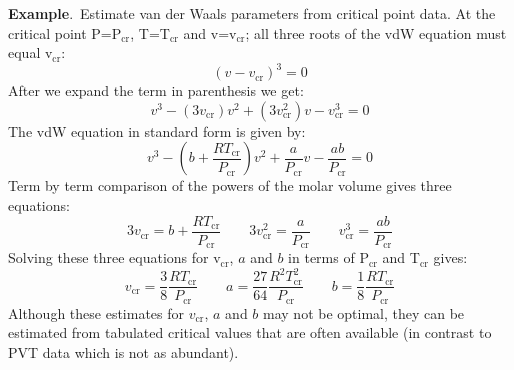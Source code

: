 \documentclass[11pt]{article}
\theoremstyle{definition}
\begin{document}
\begin{mdframed}[backgroundcolor=lgray]
\noindent\textbf{Example}.~Estimate van der Waals parameters from critical point data.
At the critical point P=P$_{\mathrm{cr}}$, T=T$_{\mathrm{cr}}$ and v=v$_{\mathrm{cr}}$;
all three roots of the vdW equation must equal v$_{\mathrm{cr}}$:
\begin{equation}
  \left(v-v_{\mathrm{cr}}\right)^3 = 0
\end{equation}
After we expand the term in parenthesis we get:
\begin{equation}
v^3-\left(3v_{\mathrm{cr}}\right)v^2+\left(3v^{2}_{\mathrm{cr}}\right)v-v^{3}_{\mathrm{cr}} = 0
\end{equation}
The vdW equation in standard form is given by:
\begin{equation}
  v^3-\left(b+\frac{RT_{\mathrm{cr}}}{P_{\mathrm{cr}}}\right)v^2+\frac{a}{P_{\mathrm{cr}}}v-\frac{ab}{P_{\mathrm{cr}}} = 0
\end{equation}
Term by term comparison of the powers of the molar volume gives three equations:
\begin{equation}
  3v_{\mathrm{cr}} = b+\frac{RT_{\mathrm{cr}}}{P_{\mathrm{cr}}}\qquad
  3v^{2}_{\mathrm{cr}} = \frac{a}{P_{\mathrm{cr}}}\qquad
  v^{3}_{\mathrm{cr}} = \frac{ab}{P_{\mathrm{cr}}}
\end{equation}
Solving these three equations for v$_{\mathrm{cr}}$, $a$ and $b$ in terms of P$_{\mathrm{cr}}$ and T$_{\mathrm{cr}}$ gives:
\begin{equation}
  v_{\mathrm{cr}} = \frac{3}{8}\frac{RT_{\mathrm{cr}}}{P_{\mathrm{\mathrm{cr}}}}\qquad
  a = \frac{27}{64}\frac{R^{2}T^{2}_{\mathrm{cr}}}{P_{\mathrm{cr}}}\qquad
  b = \frac{1}{8}\frac{RT_{\mathrm{cr}}}{P_{\mathrm{cr}}}
\end{equation}
Although these estimates for $v_{\mathrm{cr}}$, $a$ and $b$ may not be optimal, they can be estimated from
tabulated critical values that are often available (in contrast to PVT data which is not as abundant).
\end{mdframed}

\end{document}

